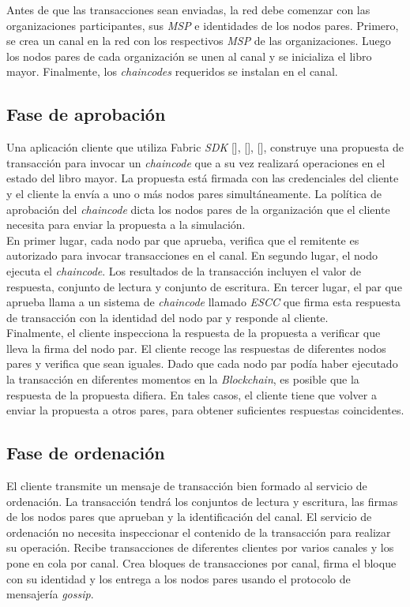 \vspace{1 cm}
Antes de que las transacciones sean enviadas, la red debe comenzar con las organizaciones participantes, sus \emph{MSP} e identidades de los nodos pares. Primero, se crea un canal en la red con los respectivos \emph{MSP} de las organizaciones. Luego los nodos pares de cada organizaci\'on se unen al canal y se inicializa el libro mayor. Finalmente, los \emph{chaincodes} requeridos se instalan en el canal.


\subsection{Fase de aprobaci\'on}
Una aplicaci\'on cliente que utiliza Fabric \emph{SDK} [\cite{Go-SDK}], [\cite{Node-SDK}], [\cite{Java-SDK}], construye una propuesta de transacci\'on para invocar un \emph{chaincode} que a su vez realizar\'a operaciones en el estado del libro mayor. La propuesta est\'a firmada con las credenciales del cliente y el cliente la env\'ia a uno o m\'as nodos pares simult\'aneamente. La pol\'itica de aprobaci\'on del \emph{chaincode} dicta los nodos pares de la organizaci\'on que el cliente necesita para enviar la propuesta a la simulaci\'on.\\

En primer lugar, cada nodo par que aprueba, verifica que el remitente es autorizado para invocar transacciones en el canal. En segundo lugar, el nodo ejecuta el \emph{chaincode}. Los resultados de la transacci\'on incluyen el valor de respuesta, conjunto de lectura y conjunto de escritura. En tercer lugar, el par que aprueba llama a un sistema de \emph{chaincode} llamado \emph{ESCC} que firma esta respuesta de transacci\'on con la identidad del nodo par y responde al cliente.\\

Finalmente, el cliente inspecciona la respuesta de la propuesta a verificar que lleva la firma del nodo par. El cliente recoge las respuestas de diferentes nodos pares y verifica que sean iguales. Dado que cada nodo par pod\'ia haber ejecutado la transacci\'on en diferentes momentos en la \emph{Blockchain}, es posible que la respuesta de la propuesta difiera. En tales casos, el cliente tiene que volver a enviar la propuesta a otros pares, para obtener suficientes respuestas coincidentes.

\subsection{Fase de ordenaci\'on}
El cliente transmite un mensaje de transacci\'on bien formado al servicio de ordenaci\'on. La transacci\'on tendr\'a los conjuntos de lectura y escritura, las firmas de los nodos pares que aprueban y la identificaci\'on del canal. El servicio de ordenaci\'on no necesita inspeccionar el contenido de la transacci\'on para realizar su operaci\'on. Recibe transacciones de diferentes clientes por varios canales y los pone en cola por canal. Crea bloques de transacciones por canal, firma el bloque con su identidad y los entrega a los nodos pares usando el protocolo de mensajer\'ia \emph{gossip}.

